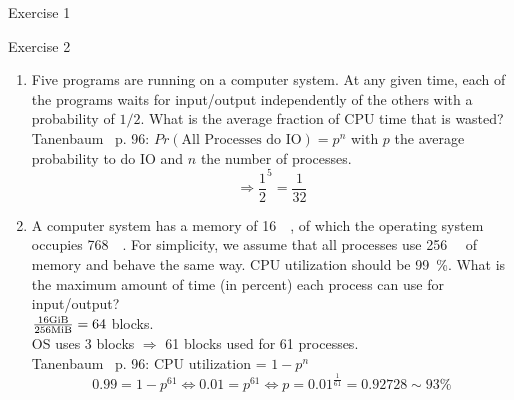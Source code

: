 \documentclass[10pt]{beamer}
\begin{document}
\begin{frame}[allowframebreaks]{Exercise 1}
\end{frame}

\begin{frame}[allowframebreaks]{Exercise 2}
\begin{enumerate}
		\item%
			Five programs are running on a computer system.
			At any given time, each of the programs waits for input/output independently of the others with a probability of $1/2$.
			What is the average fraction of CPU time that is wasted? \\
			\alert{Tanenbaum~\autocite{tanenbaum} p. 96: $Pr(\text{All Processes do IO}) = p^n$
			with $p$ the average probability to do IO and $n$ the number of processes.
			\[\Rightarrow \frac{1}{2}^5 = \frac{1}{32} \]}
        \framebreak
		\item%
			A computer system has a memory of \SI{16}{\gibi\byte}, of which the operating system occupies \SI{768}{\mebi\byte}.
			For simplicity, we assume that all processes use \SI{256}{\mebi\byte} of memory and behave the same way.
			CPU utilization should be \SI{99}{\percent}.
			What is the maximum amount of time (in percent) each process can use for input/output? \\ \vspace{0.5cm}
			\alert{$\frac{16\si{\gibi\byte}}{256\si{\mebi\byte}} = 64$ blocks. \\
			OS uses 3 blocks $\Rightarrow$ 61 blocks used for 61 processes. \\
			Tanenbaum~\autocite{tanenbaum} p. 96: CPU utilization = $1-p^n$ \\
			\[ 0.99 = 1-p^{61} \Leftrightarrow 0.01 = p^{61} \Leftrightarrow p = 0.01^{\frac{1}{61}} = 0.92728 \sim 93\% \]}
	\end{enumerate}
\end{frame}
\end{document}
